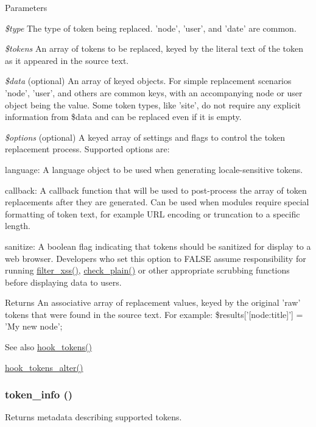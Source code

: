 \begin{DoxyParams}{Parameters}
\item[{\em \$type}]The type of token being replaced. 'node', 'user', and 'date' are common. \item[{\em \$tokens}]An array of tokens to be replaced, keyed by the literal text of the token as it appeared in the source text. \item[{\em \$data}](optional) An array of keyed objects. For simple replacement scenarios 'node', 'user', and others are common keys, with an accompanying node or user object being the value. Some token types, like 'site', do not require any explicit information from \$data and can be replaced even if it is empty. \item[{\em \$options}](optional) A keyed array of settings and flags to control the token replacement process. Supported options are:
\begin{DoxyItemize}
\item language: A language object to be used when generating locale-\/sensitive tokens.
\item callback: A callback function that will be used to post-\/process the array of token replacements after they are generated. Can be used when modules require special formatting of token text, for example URL encoding or truncation to a specific length.
\item sanitize: A boolean flag indicating that tokens should be sanitized for display to a web browser. Developers who set this option to FALSE assume responsibility for running \hyperlink{group__sanitization_ga8864a29ffa8de5c9f8dc9e417060660d}{filter\_\-xss()}, \hyperlink{group__sanitization_ga76fc67a30fd8d75ddd80565e6e65a13d}{check\_\-plain()} or other appropriate scrubbing functions before displaying data to users.
\end{DoxyItemize}\end{DoxyParams}
\begin{DoxyReturn}{Returns}
An associative array of replacement values, keyed by the original 'raw' tokens that were found in the source text. For example: \$results\mbox{[}'\mbox{[}node:title\mbox{]}'\mbox{]} = 'My new node';
\end{DoxyReturn}
\begin{DoxySeeAlso}{See also}
\hyperlink{group__hooks_ga3bfd87d9a19b2397b0f970e1cff7ea4f}{hook\_\-tokens()} 

\hyperlink{group__hooks_gaeeea438e74b29e5603f0ed3f1967a257}{hook\_\-tokens\_\-alter()} 
\end{DoxySeeAlso}
\hypertarget{includes_2token_8inc_a24f0543f20ed0c8b807a680e67248704}{
\subsubsection[{token\_\-info}]{\setlength{\rightskip}{0pt plus 5cm}token\_\-info ()}}
\label{includes_2token_8inc_a24f0543f20ed0c8b807a680e67248704}
Returns metadata describing supported tokens.

